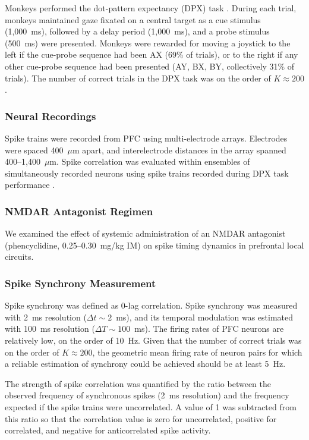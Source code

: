 \documentclass[12pt]{article}
\begin{document}
Monkeys performed the dot-pattern expectancy (DPX) task \citep{Jones2010, Zick2018}. During each trial, monkeys maintained gaze fixated on a central target as a cue stimulus (1{,}000~ms), followed by a delay period (1{,}000~ms), and a probe stimulus (500~ms) were presented. Monkeys were rewarded for moving a joystick to the left if the cue-probe sequence had been AX (69\% of trials), or to the right if any other cue-probe sequence had been presented (AY, BX, BY, collectively 31\% of trials). The number of correct trials in the DPX task was on the order of $K \approx 200$.

\subsubsection{Neural Recordings}

Spike trains were recorded from PFC using multi-electrode arrays. Electrodes were spaced 400~$\mu$m apart, and interelectrode distances in the array spanned 400--1{,}400~$\mu$m. Spike correlation was evaluated within ensembles of simultaneously recorded neurons using spike trains recorded during DPX task performance \citep{Zick2018}.

\subsubsection{NMDAR Antagonist Regimen}

We examined the effect of systemic administration of an NMDAR antagonist (phencyclidine, 0.25--0.30~mg/kg IM) on spike timing dynamics in prefrontal local circuits.

\subsubsection{Spike Synchrony Measurement}

Spike synchrony was defined as 0-lag correlation. Spike synchrony was measured with 2~ms resolution ($\Delta t \sim 2$~ms), and its temporal modulation was estimated with 100~ms resolution ($\Delta T \sim 100$~ms). The firing rates of PFC neurons are relatively low, on the order of 10~Hz. Given that the number of correct trials was on the order of $K \approx 200$, the geometric mean firing rate of neuron pairs for which a reliable estimation of synchrony could be achieved should be at least 5~Hz.

The strength of spike correlation was quantified by the ratio between the observed frequency of synchronous spikes (2~ms resolution) and the frequency expected if the spike trains were uncorrelated. A value of 1 was subtracted from this ratio so that the correlation value is zero for uncorrelated, positive for correlated, and negative for anticorrelated spike activity.
\end{document}

